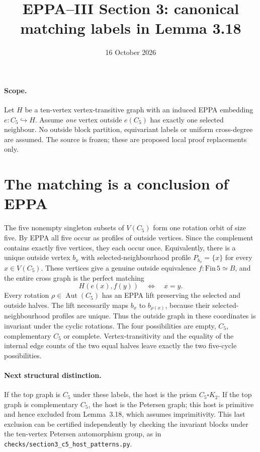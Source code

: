 \documentclass[11pt,a4paper]{article}
\title{EPPA--III Section 3: canonical matching labels in Lemma 3.18}
\date{16 October 2026}
\begin{document}
\maketitle
\paragraph{Scope.}
Let \(H\) be a ten-vertex vertex-transitive graph with an
induced EPPA embedding \(e:C_5\hookrightarrow H\).
Assume \emph{one} vertex outside \(e(C_5)\) has exactly
one selected neighbour. No outside block partition,
equivariant labels or uniform cross-degree are assumed.
The source is frozen; these are proposed local
proof replacements only.

\section*{The matching is a conclusion of EPPA}
The five nonempty singleton subsets of \(V(C_5)\)
form one rotation orbit of size five. By EPPA all five
occur as profiles of outside vertices. Since the
complement contains exactly five vertices, they each
occur once. Equivalently, there is a unique outside
vertex \(b_x\) with selected-neighbourhood profile
\(P_{b_x}=\{x\}\) for every \(x\in V(C_5)\).
These vertices give a genuine outside equivalence
\(f:\mathrm{Fin}\,5\simeq B\), and the entire cross graph
is the perfect matching
\[
     H(e(x),f(y))\quad\Longleftrightarrow\quad x=y.
\]
Every rotation \(\rho\in\operatorname{Aut}(C_5)\) has
an EPPA lift preserving the selected and outside halves.
The lift necessarily maps \(b_x\) to \(b_{\rho(x)}\),
because their selected-neighbourhood profiles are unique.
Thus the outside graph in these coordinates is invariant
under the cyclic rotations. The four possibilities are
empty, \(C_5\), complementary \(C_5\) or complete.
Vertex-transitivity and the equality of the internal
edge counts of the two equal halves leave exactly the
two five-cycle possibilities.

\paragraph{Next structural distinction.}
If the top graph is \(C_5\) under these labels,
the host is the prism \(C_5\square K_2\).
If the top graph is complementary \(C_5\),
the host is the Petersen graph; this host is primitive
and hence excluded from Lemma~3.18, which assumes
imprimitivity. This last exclusion can be certified
independently by checking the invariant blocks under
the ten-vertex Petersen automorphism group, as in
\texttt{checks/section3\_c5\_host\_patterns.py}.
\end{document}
